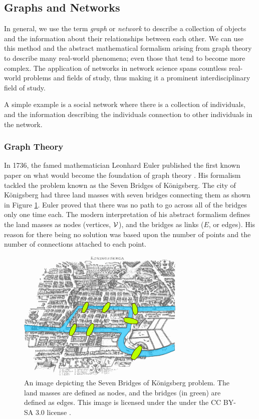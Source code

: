 \subsection{Graphs and Networks} \label{intro-network}
 In general, we use the term \textit{graph} or \textit{network} to describe a collection of objects and the information about their relationships between each other. We can use this method and the abstract mathematical formalism arising from graph theory to describe many real-world phenomena; even those that tend to become more complex. The application of networks in network science spans countless real-world problems and fields of study, thus making it a prominent interdisciplinary field of study. 
 
 A simple example is a social network where there is a collection of individuals, and the information describing the individuals connection to other individuals in the network. 

\subsubsection{Graph Theory} \label{intro-net-graph}

In 1736, the famed mathematician Leonhard Euler published the first known paper on what would become the foundation of graph theory \citep{Euler1736}. His formalism tackled the problem known as the Seven Bridges of Königsberg. The city of Königsberg had three land masses with seven bridges connecting them as shown in Figure \ref{fig:konigsberg}. Euler proved that there was no path to go across all of the bridges only one time each. The modern interpretation of his abstract formalism defines the land masses as nodes (vertices, $\mathcal{V}$), and the bridges as links ($E$, or edges). His reason for there being no solution was based upon the number of points and the number of connections attached to each point. 

\begin{figure}[t]
    \centering
    \includegraphics[scale = 0.75]{figure/background/Konigsberg_bridges.png}
    \caption[An image depicting the Seven Bridges of Königsberg problem. The land masses are defined as  nodes, and the bridges (in green) are defined as edges.]{An image depicting the Seven Bridges of Königsberg problem. The land masses are defined as  nodes, and the bridges (in green) are defined as edges. This image is licensed under the under the CC BY-SA 3.0 license \citep{Giusca2005}.}
    \label{fig:konigsberg}
\end{figure}

